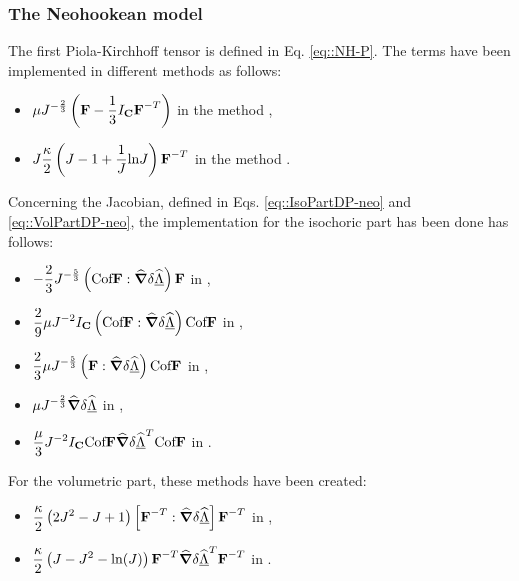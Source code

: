 \subsubsection{The Neohookean model} The first Piola-Kirchhoff tensor
is defined in Eq. \eqref{eq::NH-P}. The terms have been implemented in
different methods as follows:
\begin{itemize}
\item $\displaystyle \mu
  J^{-\frac{2}{3}}\left(\textbf{F}-\frac{1}{3}I_{\textbf{C}}\textbf{F}^{-T}\right)$ in the
  method ,
\item $\displaystyle
  J\frac{\kappa}{2}\left(J-1+\frac{1}{J}\text{ln}J\right)\textbf{F}^{-T}$ in the
  method .
\end{itemize}
Concerning the Jacobian, defined in
Eqs. \eqref{eq::IsoPartDP-neo} and \eqref{eq::VolPartDP-neo}, the
implementation for the isochoric part has been done has follows:
\begin{itemize}
\item $\displaystyle
  -\frac{2}{3}J^{-\frac{5}{3}}\left(\text{Cof}\textbf{F}:\widehat{\boldsymbol{\nabla}}\delta\widehat{\underline{\Lambda}}\right)\textbf{F}$ in
  ,
\item $\displaystyle \frac{2}{9}\mu
  J^{-2}I_{\textbf{C}}\left(\text{Cof}\textbf{F}:\widehat{\boldsymbol{\nabla}}\delta\widehat{\underline{\Lambda}}\right)\text{Cof}\textbf{F}$ in
  ,
\item $\displaystyle \frac{2}{3}\mu
  J^{-\frac{5}{3}}\left(\textbf{F}:\widehat{\boldsymbol{\nabla}}\delta\widehat{\underline{\Lambda}}\right)\text{Cof}\textbf{F}$ in
  ,
\item $\displaystyle \mu J^{-\frac{2}{3}}\widehat{\boldsymbol{\nabla}}\delta\widehat{\underline{\Lambda}}$ in
  ,
\item $\displaystyle
  \frac{\mu}{3}J^{-2}I_{\textbf{C}}\text{Cof}\textbf{F}\widehat{\boldsymbol{\nabla}}\delta\widehat{\underline{\Lambda}}^T\text{Cof}\textbf{F}$ in
  .
\end{itemize}
For the volumetric part, these methods have been
created:
\begin{itemize}
\item $\displaystyle
  \frac{\kappa}{2}\left(2J^2-J+1\right)\left[\textbf{F}^{-T}:\widehat{\boldsymbol{\nabla}}\delta\widehat{\underline{\Lambda}}\right]\textbf{F}^{-T}$
  in ,
\item $\displaystyle
  \frac{\kappa}{2}\left(J-J^2-\text{ln}(J)\right)\textbf{F}^{-T}\widehat{\boldsymbol{\nabla}}\delta\widehat{\underline{\Lambda}}^T\textbf{F}^{-T}$
  in .
\end{itemize}


